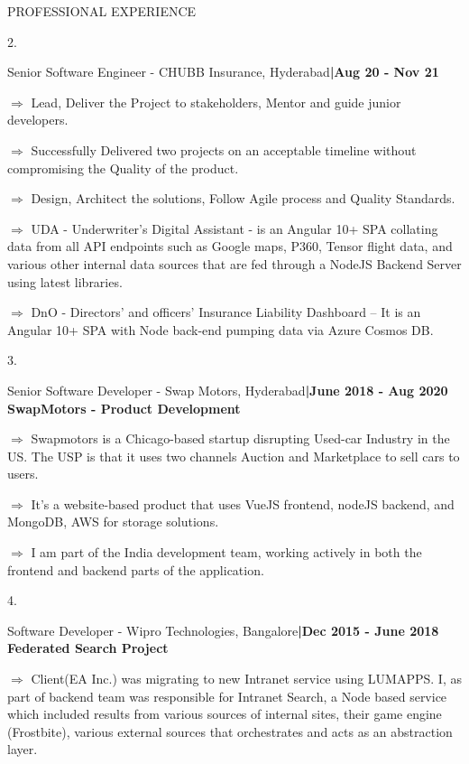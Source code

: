 \documentclass{resume} %
\begin{document}
\begin{rSection}{PROFESSIONAL EXPERIENCE}
\item[2.]\begin{rSubsection}{Senior Software Engineer - CHUBB Insurance, Hyderabad}{\bf |Aug 20 - Nov 21}
{{\bf}}{}
\item[$\Rightarrow$] Lead, Deliver the Project to stakeholders, Mentor and guide junior developers.
\item[$\Rightarrow$] Successfully Delivered two projects on an acceptable timeline without compromising the Quality of the product.
\item[$\Rightarrow$] Design, Architect the solutions, Follow Agile process and Quality Standards.
\item[$\Rightarrow$]UDA - Underwriter's Digital Assistant - is an Angular 10+ SPA collating data from all API endpoints such as Google maps, P360, Tensor flight data, and various other internal data sources that are fed through a NodeJS Backend Server using latest libraries.
\item[$\Rightarrow$] DnO - Directors' and officers' Insurance Liability Dashboard -- It is an Angular 10+ SPA with Node back-end pumping data via Azure Cosmos DB.
\end{rSubsection}
\vspace{1em}
\item[3.]\begin{rSubsection}{Senior Software Developer - Swap Motors, Hyderabad}{\bf |June 2018 - Aug 2020}
{{\bf SwapMotors - Product Development}}{}
\item[$\Rightarrow$] Swapmotors is a Chicago-based startup disrupting Used-car Industry in the US. The USP is that it uses two channels Auction and Marketplace to sell cars to users.
\item[$\Rightarrow$] It's a website-based product that uses VueJS frontend, nodeJS backend, and MongoDB, AWS for storage solutions.
\item[$\Rightarrow$]I am part of the India development team, working actively in both the frontend and backend parts of the application.\\
\end{rSubsection}
\vspace{0.5em}
\item[4.]\begin{rSubsection}{Software Developer - Wipro Technologies, Bangalore}{\bf |Dec 2015 - June 2018}
{{\bf Federated Search Project}}{}
\item[$\Rightarrow$]Client(EA Inc.) was migrating to new Intranet service using LUMAPPS. I, as part of backend team was responsible for Intranet Search, a Node based service which included results from various sources of internal sites, their game engine (Frostbite), various external sources that orchestrates and acts as an abstraction layer.

\end{rSubsection}
\end{rSection}
\end{document}
